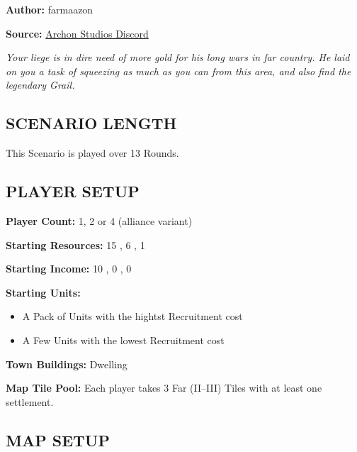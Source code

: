 
\begin{multicols*}{2}

    \textbf{Author:} farmaazon

    \textbf{Source:} \href{https://discordapp.com/channels/740870068178649108/1344400556717768865/1344400556717768865}{Archon Studios Discord}

    \textit{Your liege is in dire need of more gold for his long wars in far country. He laid on you a task of squeezing as much as you can from this area, and also find the legendary Grail.}

    \subsection*{\MakeUppercase{Scenario Length}}

    This Scenario is played over 13 Rounds.

    \subsection*{\MakeUppercase{Player Setup}}

    \textbf{Player Count:} 1, 2 or 4 (alliance variant)

    \textbf{Starting Resources:} 15 , 6 , 1 

    \textbf{Starting Income:} 10 , 0 , 0 

    \textbf{Starting Units:}
    \begin{itemize}
        \item A Pack of  Units with the hightst Recruitment cost
        \item A Few  Units with the lowest Recruitment cost
    \end{itemize}

    \textbf{Town Buildings:}  Dwelling

    \textbf{Map Tile Pool:} Each player takes 3 Far (II--III) Tiles with at least one settlement.

    \vfill

    \subsection*{\MakeUppercase{Map Setup}}


\end{multicols*}
